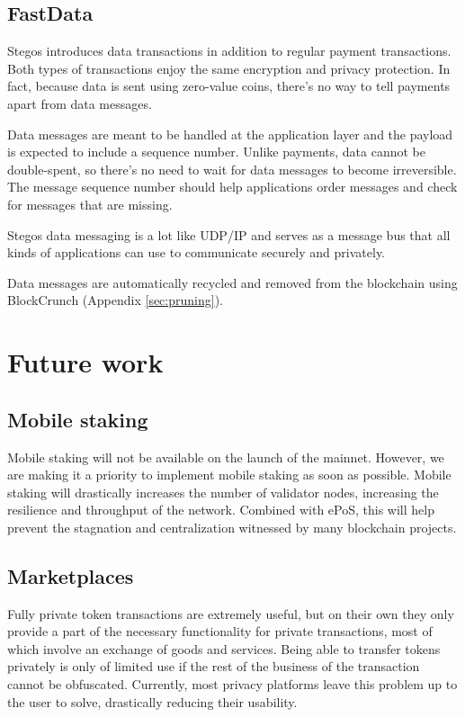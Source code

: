 \documentclass[8pt,fleqn,openany]{book}
\begin{document}
	\section{FastData}\label{sec:fastdata}
	Stegos introduces data transactions in addition to regular payment transactions. Both types of transactions enjoy the same encryption and privacy protection. In fact, because data is sent using zero-value coins, there’s no way to tell payments apart from data messages. 
	
	Data messages are meant to be handled at the application layer and the payload is expected to include a sequence number. Unlike payments, data cannot be double-spent, so there’s no need to wait for data messages to become irreversible. The message sequence number should help applications order messages and check for messages that are missing. 
	
	Stegos data messaging is a lot like UDP/IP and serves as a message bus that all kinds of applications can use to communicate securely and privately.
	
	Data messages are automatically recycled and removed from the blockchain using BlockCrunch (Appendix \ref{sec:pruning}).
	
	\chapter{Future work}\label{chap:future-work}
	
	\section{Mobile staking}\label{sec:mobile-staking}
	Mobile staking will not be available on the launch of the mainnet. However, we are making it a priority to implement mobile staking as soon as possible. Mobile staking will drastically increases the number of validator nodes, increasing the resilience and throughput of the network. Combined with ePoS, this will help prevent the stagnation and centralization witnessed by many blockchain projects.
	
	\section{Marketplaces}\label{sec:marketplaces}
	Fully private token transactions are extremely useful, but on their own they only provide a part of the necessary functionality for private transactions, most of which involve an exchange of goods and services. Being able to transfer tokens privately is only of limited use if the rest of the business of the transaction cannot be obfuscated. Currently, most privacy platforms leave this problem up to the user to solve, drastically reducing their usability.
	
\end{document}
